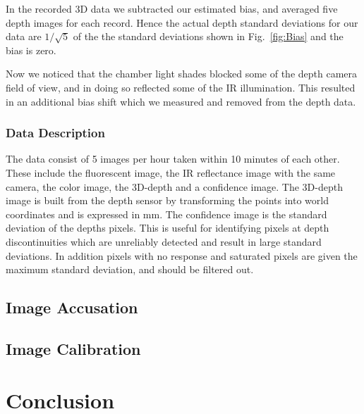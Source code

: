 In the recorded 3D data we subtracted our estimated bias, and averaged five depth images for each record.  Hence the actual depth standard deviations for our data are $1/\sqrt{5}$ of the the standard deviations shown in Fig.~\ref{fig:Bias} and the bias is zero.

Now we noticed that the chamber light shades blocked some of the depth camera field of view, and in doing so reflected some of the IR illumination.  This resulted in an additional bias shift which we measured and removed from the depth data.

\subsubsection{Data Description}

The data consist of 5 images per hour taken within 10 minutes of each other.  These include the fluorescent image, the IR reflectance image with the same camera, the color image, the 3D-depth and a confidence image.  The 3D-depth image is built from the depth sensor by transforming the points into world coordinates and is expressed in mm.  The confidence image is the standard deviation of the depths pixels.  This is useful for identifying pixels at depth discontinuities which are unreliably detected and result in large standard deviations.  In addition pixels with no response and saturated pixels are given the maximum standard deviation, and should be filtered out.


\subsection{Image Accusation}

\subsection{Image Calibration}






\section{Conclusion}

